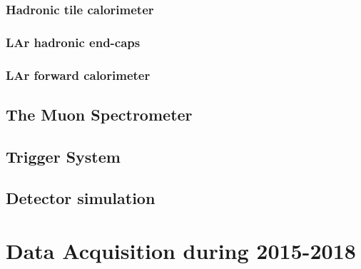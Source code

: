 \subsubsection{Hadronic tile calorimeter}

\subsubsection{LAr hadronic end-caps}


\subsubsection{LAr forward calorimeter}


\subsection{The Muon Spectrometer}

\subsection{Trigger System}

\subsection{Detector simulation}


\section{Data Acquisition during 2015-2018}

